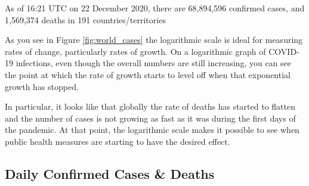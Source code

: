 As of 16:21 UTC on 22 December 2020, there are \colorbox{blue!30}{68,894,596} confirmed cases, and \colorbox{red!30}{1,569,374} deaths in 191 countries/territories

As you see in Figure \ref{fig:world_cases} the logarithmic scale is ideal for measuring rates of change, particularly rates of growth. On a logarithmic graph of COVID-19 infections, even though the overall numbers are still increasing, you can see the point at which the rate of growth starts to level off when that exponential growth has stopped.

In particular, it looks like that globally the rate of deaths has started to flatten and the number of cases is not growing as fast as it was during the first days of the pandemic. At that point, the logarithmic scale makes it possible to see when public health measures are starting to have the desired effect.

\newpage
\subsection{Daily Confirmed Cases \& Deaths}

